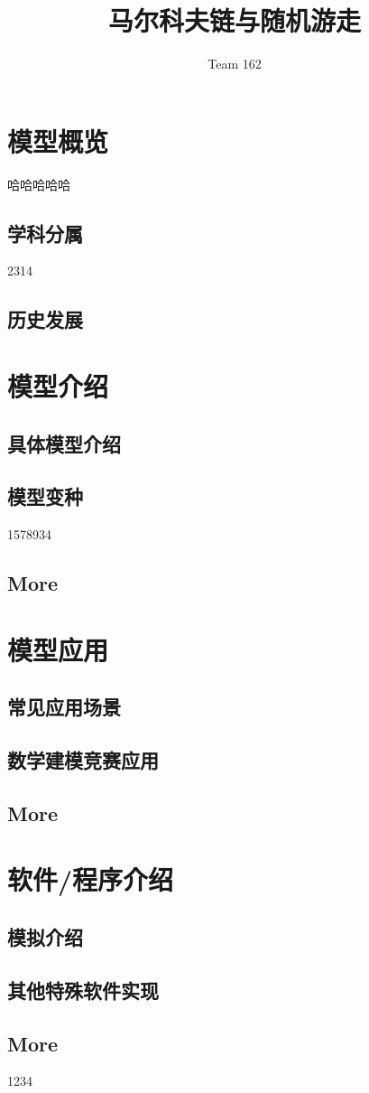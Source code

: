 \documentclass{ctexart}
\title{\textbf{马尔科夫链与随机游走}}
\author{Team 162}
\begin{document}
\maketitle
\tableofcontents
\section{模型概览}
哈哈哈哈哈
\subsection{学科分属}
2314
\subsection{历史发展}

\section{模型介绍}

\subsection{具体模型介绍}

\subsection{模型变种}
1578934
\subsection{More}


\section{模型应用}

\subsection{常见应用场景}


\subsection{数学建模竞赛应用}

\subsection{More}



\section{软件/程序介绍}

\subsection{模拟介绍}

\subsection{其他特殊软件实现}

\subsection{More}



\begin{appendices}
1234
\end{appendices}
\end{document}
